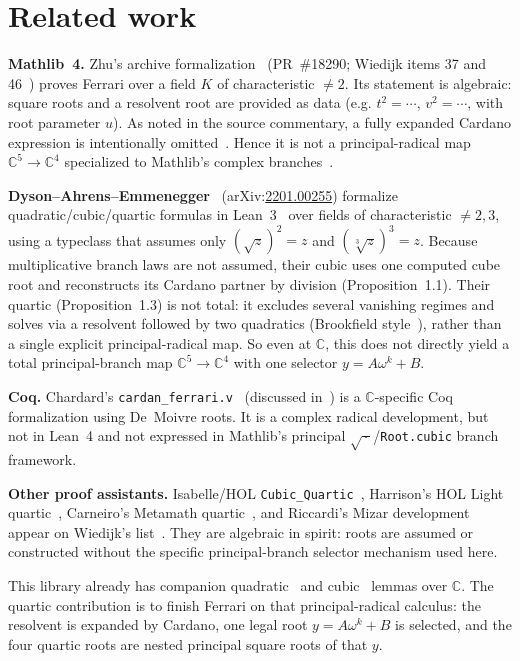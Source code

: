 \documentclass[11pt,a4paper]{article}
\newcommand{\C}{\mathbb{C}}
\begin{document}
\section{Related work}
\label{sec:related}

\textbf{Mathlib~4.}
Zhu's archive formalization~\cite{zhu2024mathlibquartic} (PR~\#18290; Wiedijk items 37 and 46~\cite{wiedijk100}) proves Ferrari over a field \(K\) of characteristic \(\neq 2\).
Its statement is algebraic: square roots and a resolvent root are provided as data (e.g.
\(t^2=\cdots\), \(v^2=\cdots\), with root parameter \(u\)).
As noted in the source commentary, a fully expanded Cardano expression is intentionally omitted~\cite{zwillinger2003}.
Hence it is not a principal-radical map \(\C^5\to\C^4\) specialized to Mathlib's complex branches~\cite{mathlib}.

\textbf{Dyson--Ahrens--Emmenegger}~\cite{dyson2022polynomials}
(arXiv:\href{https://arxiv.org/abs/2201.00255}{2201.00255})
formalize quadratic/cubic/quartic formulas in Lean~3~\cite{moura2015lean} over fields of characteristic \(\neq 2,3\), using a typeclass that assumes only
\((\sqrt{z})^2=z\) and \((\sqrt[3]{z})^3=z\).
Because multiplicative branch laws are not assumed, their cubic uses one computed cube root and reconstructs its Cardano partner by division (Proposition~1.1).
Their quartic (Proposition~1.3) is not total: it excludes several vanishing regimes and solves via a resolvent followed by two quadratics (Brookfield style~\cite{brookfield2007}), rather than a single explicit principal-radical map.
So even at \(\C\), this does not directly yield a total principal-branch map \(\C^5\to\C^4\) with one selector \(y=A\omega^k+B\).

\textbf{Coq.}
Chardard's \texttt{cardan\_ferrari.v}~\cite{chardard2021coq} (discussed in~\cite{dyson2022polynomials}) is a \(\C\)-specific Coq formalization using De~Moivre roots.
It is a complex radical development, but not in Lean~4 and not expressed in Mathlib's principal \(\sqrt{\,\cdot\,}\)/\texttt{Root.cubic} branch framework.

\textbf{Other proof assistants.}
Isabelle/{HOL} \texttt{Cubic\_Quartic}~\cite{chaieb2021isabelle}, Harrison's {HOL} Light quartic~\cite{harrisonhol}, Carneiro's Metamath quartic~\cite{carneiroquartic}, and Riccardi's Mizar development~\cite{riccardi2009} appear on Wiedijk's list~\cite{wiedijk100}.
They are algebraic in spirit: roots are assumed or constructed without the specific principal-branch selector mechanism used here.

This library already has companion quadratic~\cite{lemma_quadratic_lean} and cubic~\cite{lemma_cubic_lean} lemmas over \(\C\).
The quartic contribution is to finish Ferrari on that principal-radical calculus: the resolvent is expanded by Cardano, one legal root \(y=A\omega^{k}+B\) is selected, and the four quartic roots are nested principal square roots of that \(y\).
\end{document}
